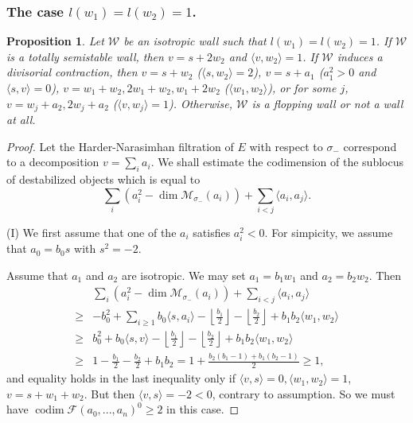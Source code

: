\documentclass[leqno,11pt]{amsart}
\def\codim{\mathop{\mathrm{codim}}\nolimits}
\def\dim{\mathop{\mathrm{dim}}\nolimits}
\newtheorem{Prop}[Thm]{Proposition}
\theoremstyle{definition}
\def\FF{\ensuremath{\mathcal F}}
\def\MM{\ensuremath{\mathcal M}}
\def\WW{\ensuremath{\mathcal W}}
\begin{document}
\subsubsection{The case $l(w_1)=l(w_2)=1$.}
\begin{Prop}
Let $\WW$ be an isotropic wall such that $l(w_1)=l(w_2)=1$.  If $\WW$ is a totally semistable wall, then $v=s+2w_2$ and $\langle v,w_2\rangle=1$.  If $\WW$ induces a divisorial contraction, then $v=s+w_2$ ($\langle s,w_2\rangle=2$), $v=s+a_1$ ($a_1^2>0$ and $\langle s,v\rangle=0$), $v=w_1+w_2,2w_1+w_2,w_1+2w_2$ ($\langle w_1,w_2\rangle$), or for some $j$, $v=w_j+a_2,2w_j+a_2$ ($\langle v,w_j\rangle=1$).  Otherwise, $\WW$ is a flopping wall or not a wall at all.
\end{Prop}
\begin{proof}  Let the Harder-Narasimhan filtration of $E$ with respect to $\sigma_-$ correspond to a decomposition $v=\sum_i a_i$.  We shall estimate the codimension of the sublocus of destabilized objects which is equal to
 \begin{equation}
\sum_i (a_i^2-\dim \MM_{\sigma_-}(a_i))+\sum_{i<j}\langle a_i,a_j \rangle.
\end{equation}


(I) We first assume that one of the $a_i$ satisfies $a_i^2<0$.
For simpicity, we assume that $a_0=b_0 s$ with $s^2=-2$.

Assume that $a_1$ and $a_2$ are isotropic.
We may set $a_1=b_1 w_1$ and $a_2=b_2 w_2$.
Then 
 \begin{equation}\label{eq: spherical 1,1 case I}
\begin{split}
& \sum_i (a_i^2-\dim \MM_{\sigma_-}(a_i))+\sum_{i<j}\langle a_i,a_j \rangle\\
\geq & -b_0^2+\sum_{i \geq 1}b_0 \langle s,a_i \rangle
-\left\lfloor\frac{b_1}{2}\right\rfloor-\left\lfloor\frac{b_2}{2}\right\rfloor+b_1 b_2 \langle w_1,w_2 \rangle\\
\geq & b_0^2+b_0 \langle s,v \rangle-\left\lfloor\frac{b_1}{2}\right\rfloor-\left\lfloor\frac{b_2}{2}\right\rfloor+b_1 b_2 \langle w_1,w_2 \rangle\\
\geq & 1-\frac{b_1}{2}-\frac{b_2}{2}+b_1 b_2=1+\frac{b_2(b_1-1)+b_1(b_2-1)}{2} \geq 1,
\end{split}
\end{equation} 
 and equality holds in the last inequality only if $\langle v, s\rangle=0,\langle w_1,w_2\rangle=1$, $v=s+w_1+w_2$.  But then $\langle v,s\rangle=-2<0$, contrary to assumption.  So we must have $\codim\FF(a_0,...,a_n)^0\geq 2$ in this case.
 


\end{proof}
\end{document}
